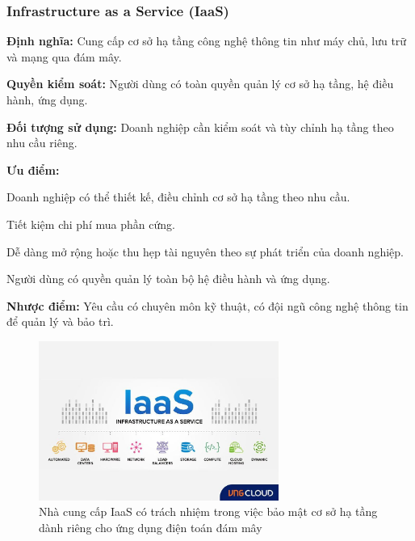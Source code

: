 \subsubsection{Infrastructure as a Service (IaaS)}
\begin{myitem}
  \item \textbf{Định nghĩa:} Cung cấp cơ sở hạ tầng công nghệ thông tin như máy chủ, lưu trữ và mạng qua đám mây.

  \item \textbf{Quyền kiểm soát:} Người dùng có toàn quyền quản lý cơ sở hạ tầng, hệ điều hành, ứng dụng.

  \item \textbf{Đối tượng sử dụng:} Doanh nghiệp cần kiểm soát và tùy chỉnh hạ tầng theo nhu cầu riêng.

  \item \textbf{Ưu điểm:}
    \begin{mysubitem}
      \item Doanh nghiệp có thể thiết kế, điều chỉnh cơ sở hạ tầng theo nhu cầu.
      \item Tiết kiệm chi phí mua phần cứng.
      \item Dễ dàng mở rộng hoặc thu hẹp tài nguyên theo sự phát triển của doanh nghiệp.
      \item Người dùng có quyền quản lý toàn bộ hệ điều hành và ứng dụng.
    \end{mysubitem}

  \item \textbf{Nhược điểm:} Yêu cầu có chuyên môn kỹ thuật, có đội ngũ công nghệ thông tin để quản lý và bảo trì.
\end{myitem}

\begin{figure}[H] %
    \centering
    \includegraphics[width=0.7\textwidth]{Tong_quan_DTDM/IaaS.jpg}
    \caption{Nhà cung cấp IaaS có trách nhiệm trong việc bảo mật cơ sở hạ tầng
dành riêng cho ứng dụng điện toán đám mây}
    \label{fig:cloud_intro}
\end{figure}

